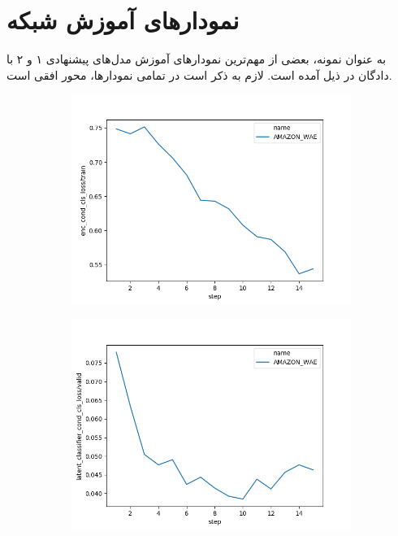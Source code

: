 \chapter{نمودار‌های آموزش شبکه}\label{app:figs}
به عنوان نمونه، بعضی از مهم‌ترین نمودار‌های آموزش مدل‌های پیشنهادی ۱ و ۲ با دادگان \amazon{} در ذیل آمده است. لازم به ذکر است در تمامی نمودار‌ها، محور‌ افقی
 است.
\begin{figure}[h]
    \centering
    \begin{subfigure}{0.3\textheight}
        \centering
        \includegraphics[width=1.\textwidth]{images/figs2/2020_01_15__11_37_34__enc_cond_cls_loss.png}
        \caption{}
        \label{fig:chap4:amazon_enc_cls}
    \end{subfigure}
    \begin{subfigure}{0.3\textheight}
        \centering
        \includegraphics[width=1.\textwidth]{images/figs2/2020_01_15__11_37_34__latent_classifier_cond_cls_loss.png}

\end{subfigure}
\end{figure}

